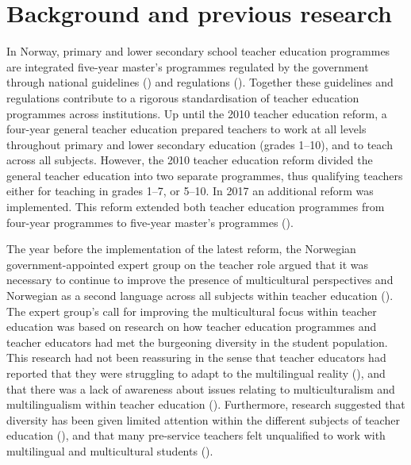 \documentclass[output=paper]{langscibook}
\begin{document}
\section{Background and previous research}
\begin{sloppypar}
In Norway, primary and lower secondary school teacher education programmes are integrated five-year master’s programmes regulated by the government through national guidelines (\citealt{UHR2016}) and regulations (\citealt{MER2016}). Together these guidelines and regulations contribute to a rigorous standardisation of teacher education programmes across institutions. Up until the 2010 teacher education reform, a four-year general teacher education prepared teachers to work at all levels throughout primary and lower secondary education (grades 1–10), and to teach across all subjects. However, the 2010 teacher education reform divided the general teacher education into two separate programmes, thus qualifying teachers either for teaching in grades 1–7, or 5–10. In 2017 an additional reform was implemented. This reform extended both teacher education programmes from four-year programmes to five-year master’s programmes (\citealt{MER2016}).
\end{sloppypar}

The year before the implementation of the latest reform, the Norwegian government\hyp appointed expert group on the teacher role argued that it was necessary to continue to improve the presence of multicultural perspectives and Norwegian as a second language across all subjects within teacher education (\citealt{DahlEtAl2016}). The expert group’s call for improving the multicultural focus within teacher education was based on research on how teacher education programmes and teacher educators had met the burgeoning diversity in the student population. This research had not been reassuring in the sense that teacher educators had reported that they were struggling to adapt to the multilingual reality (\citealt{RandenEtAl2015}), and that there was a lack of awareness about issues relating to multiculturalism and multilingualism within teacher education (\citealt{DyrnesEtAl2015}). Furthermore, research suggested that diversity has been given limited attention within the different subjects of teacher education (\citealt{Skrefsrud2015-1}), and that many pre-service teachers felt unqualified to work with multilingual and multicultural students (\citealt{The_evaluation_group2015}).
\end{document}
